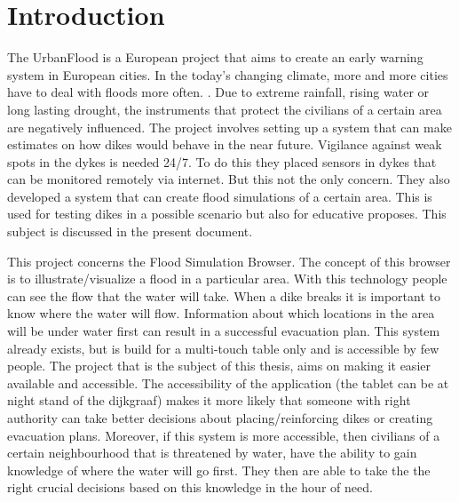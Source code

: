 
\section{Introduction}
The UrbanFlood is a European project that aims to create an early warning system in European cities\cite{UrbanFlood}. In the today's changing climate, more and more cities have to deal with floods more often. . Due to extreme rainfall, rising water or long lasting drought, the instruments that protect the civilians of a certain area are negatively influenced. The project involves setting up a system that can make estimates on how dikes would behave in the near future. Vigilance against weak spots in the dykes is needed 24/7. To do this they placed sensors in dykes that can be monitored remotely via internet. But this not the only concern. They also developed a system that can create flood simulations of a certain area. This is used for testing dikes in a possible scenario but also for educative proposes. This subject is discussed in the present document.

This project concerns the Flood Simulation Browser. The concept of this browser is to illustrate/visualize a flood in a particular area. With this technology people can see the flow that the water will take. When a dike breaks it is important to know where the water will flow. Information about which locations in the area will be under water first can result in a successful evacuation plan. This system already exists, but is build for a multi-touch table only and is accessible by few people. The project that is the subject of this thesis, aims on making it easier available and accessible. The accessibility of the application (the tablet can be at night stand of the dijkgraaf) makes it more likely that someone with right authority can take better decisions about placing/reinforcing dikes or creating evacuation plans. Moreover, if this system is more accessible, then civilians of a certain neighbourhood that is threatened by water, have the ability to gain knowledge of where the water will go first. They then are able to take the the right crucial decisions based on this knowledge in the hour of need.

